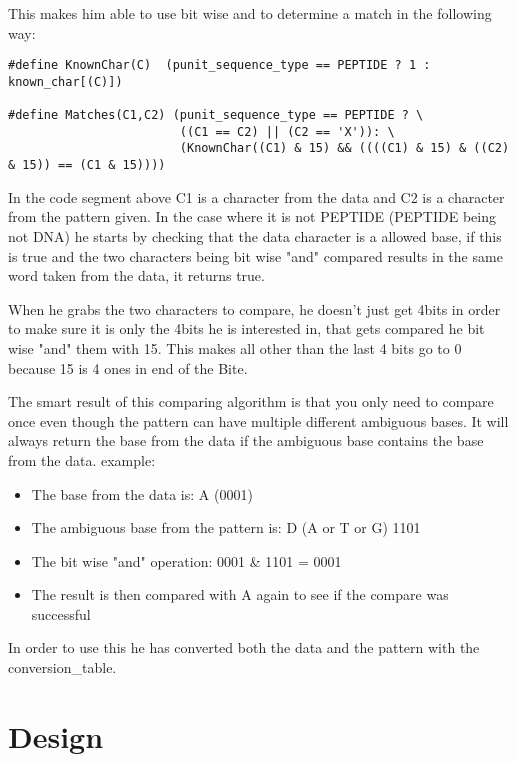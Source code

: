 \documentclass[12pt]{article}
\begin{document}
This makes him able to use bit wise and to determine a match in the following way:
\begin{lstlisting}
#define KnownChar(C)  (punit_sequence_type == PEPTIDE ? 1 : known_char[(C)])

#define Matches(C1,C2) (punit_sequence_type == PEPTIDE ? \
                        ((C1 == C2) || (C2 == 'X')): \
                        (KnownChar((C1) & 15) && ((((C1) & 15) & ((C2) & 15)) == (C1 & 15))))

\end{lstlisting}
In the code segment above C1 is a character from the data and C2 is a character from the pattern given. In the case where it is not PEPTIDE (PEPTIDE being not DNA) he starts by checking that the data character is a allowed base, if this is true and the two characters being bit wise "and" compared results in the same word taken from the data, it returns true. 

When he grabs the two characters to compare, he doesn't just get 4bits in order to make sure it is only the 4bits he is interested in, that gets compared he bit wise "and" them with 15. This makes all other than the last 4 bits go to 0 because 15 is 4 ones in end of the Bite.

The smart result of this comparing algorithm is that you only need to compare once even though the pattern can have multiple different ambiguous bases. It will always return the base from the data if the ambiguous base contains the base from the data. example: \\
\begin{itemize}
\item The base from the data is: A (0001)
\item The ambiguous base from the pattern is: D (A or T or G) 1101
\item The bit wise "and" operation: 0001 \& 1101 = 0001
\item The result is then compared with A again to see if the compare was successful
\end{itemize}
In order to use this he has converted both the data and the pattern with the conversion\_table. \\
\section{Design}
\end{document}
